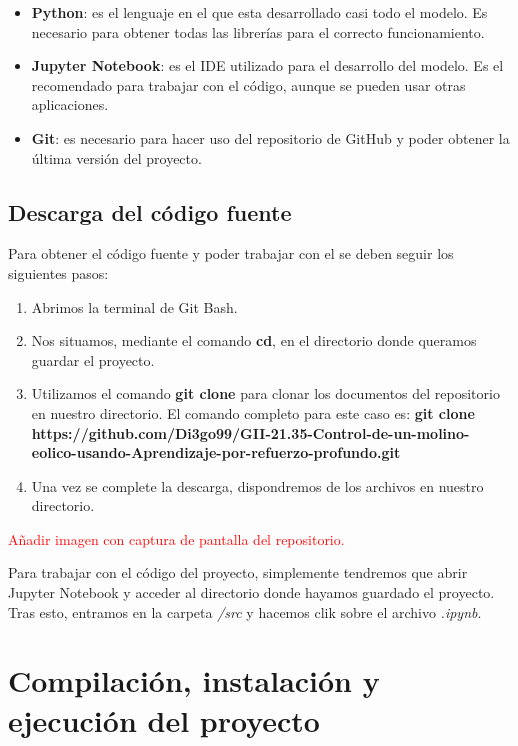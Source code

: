 \begin{itemize}
    \item \textbf{Python}: es el lenguaje en el que esta desarrollado casi todo el modelo. Es necesario para obtener todas las librerías para el correcto funcionamiento.
    \item \textbf{Jupyter Notebook}: es el IDE utilizado para el desarrollo del modelo. Es el recomendado para trabajar con el código, aunque se pueden usar otras aplicaciones.
     \item \textbf{Git}: es necesario para hacer uso del repositorio de GitHub y poder obtener la última versión del proyecto.
\end{itemize}

\subsection{Descarga del código fuente}

Para obtener el código fuente y poder trabajar con el se deben seguir los siguientes pasos:

\begin{enumerate}
    \item Abrimos la terminal de Git Bash.
    \item Nos situamos, mediante el comando \textbf{cd}, en el directorio donde queramos guardar el proyecto.
    \item Utilizamos el comando \textbf{git clone} para clonar los documentos del repositorio en nuestro directorio. El comando completo para este caso es: \textbf{git clone https://github.com/Di3go99/GII-21.35-Control-de-un-molino-eolico-usando-Aprendizaje-por-refuerzo-profundo.git}
    \item Una vez se complete la descarga, dispondremos de los archivos en nuestro directorio.
\end{enumerate}

\textcolor{red}{Añadir imagen con captura de pantalla del repositorio.}

Para trabajar con el código del proyecto, simplemente tendremos que abrir Jupyter Notebook y acceder al directorio donde hayamos guardado el proyecto. Tras esto, entramos en la carpeta \textit{/src} y hacemos clik sobre el archivo \textit{.ipynb}.


\section{Compilación, instalación y ejecución del proyecto}

